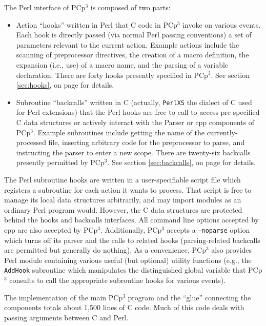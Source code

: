 \documentclass{article}
\newcommand{\pcp}{\mbox{\textsf{PCp}$^3$}}
\newcommand{\Cpp}{\mbox{\textsf{cpp}}}
\newcommand{\Perl}{\mbox{\textsf{Perl}}}
\newcommand{\C}{\mbox{\textsf{C}}}
\newcommand{\sectionref}[1]{section \ref{#1}, on page \pageref{#1}}
\newcommand{\ie}{i.e.,}
\newcommand{\eg}{e.g.,}
\begin{document}
The \Perl{} interface of \pcp{} is composed of two parts:

\begin{itemize}
\item Action ``hooks'' written in \Perl{} that \C{} code in \pcp{}
      invoke on various events. Each hook is directly passed (via
      normal \Perl{} passing conventions) a set of parameters relevant
      to the current action.  Example actions include the scanning of
      preprocessor directives, the creation of a macro definition, the
      expansion (\ie{} use) of a macro name, and the parsing of a
      variable declaration.  There are forty hooks presently
      specified in \pcp{}. See \sectionref{sec:hooks} for details.
\item Subroutine ``backcalls'' written in \C{} (actually,
      \texttt{PerlXS} the dialect of \C{} used for \Perl{} extensions)
      that the \Perl{} hooks are free to call to access pre-specified
      \C{} data structures or actively interact with the Parser or
      \Cpp{} components of \pcp{}.  Example subroutines include getting
      the name of the currently-processed file, inserting arbitrary code
      for the preprocessor to parse, and instructing the parser to enter
      a new scope.  There are twenty-six backcalls presently permitted
      by \pcp{}.  See \sectionref{sec:backcalls} for details.
\end{itemize}

\noindent The \Perl{} subroutine hooks are written in a user-specifiable script
file which registers a subroutine for each action it wants to process.
That script is free to manage its local data structures arbitrarily, and
may import modules as an ordinary \Perl{} program would.  However, the
\C{} data structures are protected behind the hooks and backcalls
interfaces. All command line options accepted by \Cpp{} are also
accepted by \pcp{}.  Additionally, \pcp{} accepts a \texttt{--noparse}
option which turns off its parser and the calls to related hooks
(parsing-related backcalls are permitted but generally do nothing).  As
a convenience, \pcp{} also provides \Perl{} module containing various
useful (but optional) utility functions (\eg{} the \texttt{AddHook}
subroutine which manipulates the distinguished global variable that
\pcp{} consults to call the appropriate subroutine hooks for various
events).

The implementation of the main \pcp{} program and the ``glue'' connecting
the components totals about 1,500 lines of \C{} code.  Much of this code
deals with passing arguments between \C{} and \Perl{}.
\end{document}
